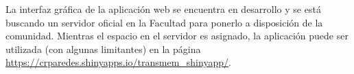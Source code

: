 La interfaz gráfica de la aplicación web se encuentra en desarrollo y se está buscando un servidor oficial en la Facultad para ponerlo a disposición de la comunidad. Mientras el espacio en el servidor es asignado, la aplicación puede ser utilizada (con algunas limitantes) en la página \url{https://crparedes.shinyapps.io/transmem_shinyapp/}.
\clearpage
{}



